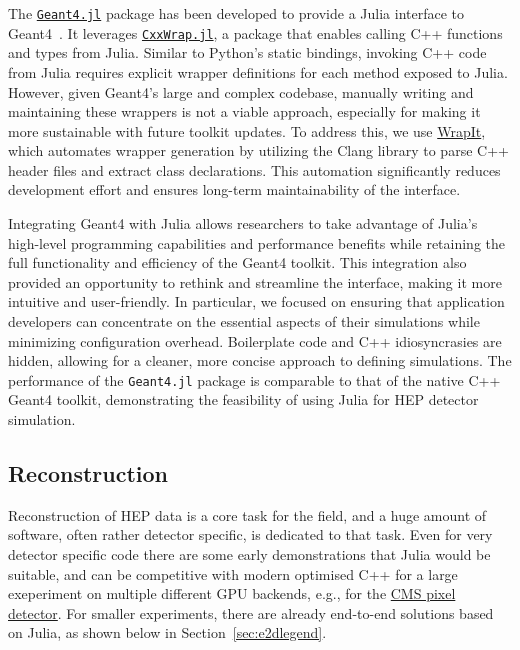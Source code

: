 \documentclass{webofc}
\begin{document}
The \href{https://github.com/JuliaHEP/Geant4.jl}{\texttt{Geant4.jl}} package has
been developed to provide a Julia interface to Geant4~\cite{ALLISON2016186}. It
leverages
\href{https://github.com/JuliaInterop/CxxWrap.jl}{\texttt{CxxWrap.jl}}, a
package that enables calling C++ functions and types from Julia. Similar to
Python's static bindings, invoking C++ code from Julia requires explicit wrapper
definitions for each method exposed to Julia. However, given Geant4's large and
complex codebase, manually writing and maintaining these wrappers is not a
viable approach, especially for making it more sustainable with future toolkit
updates. To address this, we use
\href{https://github.com/grasph/wrapit}{WrapIt}, which automates wrapper
generation by utilizing the Clang library to parse C++ header files and extract
class declarations. This automation significantly reduces development effort and
ensures long-term maintainability of the interface.

Integrating Geant4 with Julia allows researchers to take advantage of Julia's
high-level programming capabilities and performance benefits while retaining the
full functionality and efficiency of the Geant4 toolkit. This integration also
provided an opportunity to rethink and streamline the interface, making it more
intuitive and user-friendly. In particular, we focused on ensuring that
application developers can concentrate on the essential aspects of their
simulations while minimizing configuration overhead. Boilerplate code and C++
idiosyncrasies are hidden, allowing for a cleaner, more concise approach to
defining simulations. The performance of the \texttt{Geant4.jl} package is
comparable to that of the native C++ Geant4 toolkit, demonstrating the
feasibility of using Julia for HEP detector simulation.

\subsection{Reconstruction}

Reconstruction of HEP data is a core task for the field, and a huge amount of
software, often rather detector specific, is dedicated to that task. Even for
very detector specific code there are some early demonstrations that Julia would
be suitable, and can be competitive with modern optimised C++ for a large
exeperiment on multiple different GPU backends, e.g., for the \href{https://indico.cern.ch/event/1410341/contributions/6135572/}{CMS pixel
detector}. For smaller experiments, there are already
end-to-end solutions based on Julia, as shown below in
Section~\ref{sec:e2dlegend}.
\end{document}
